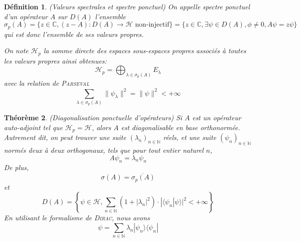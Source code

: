 \documentclass[svgnames,dvipsnames,a4paper,10pt,french]{report}
\newtheorem{theorem}{Théorème}[section]
\newtheorem{definition}[theorem]{Définition}
\begin{document}
\begin{appendices}
\begin{definition}{(Valeurs spectrales et spectre ponctuel)}
On appelle spectre ponctuel d'un opérateur $A$ sur $D(A)$ l'ensemble 
\begin{equation}
    \sigma_p(A) = \{ z\in\mathbb{C}, (z-A):D(A) \rightarrow \mathcal{H} \, \, \text{non-injectif} \} = \{z\in\mathbb{C}, \exists \psi\in D(A), \phi \neq 0,  A\psi = z\psi \}
\end{equation}
qui est donc l'ensemble de ses valeurs propres.

On note $\mathcal{H}_p$ la somme directe des espaces sous-espaces propres associés à toutes les valeurs propres ainsi obtenues:
\begin{equation}
    \mathcal{H}_p = \bigoplus_{\lambda\in\sigma_p(A)}E_\lambda
\end{equation}
avec la relation de \textsc{Parseval}
\begin{equation}
    \sum_{\lambda\in\sigma_p(A)} \|\psi_\lambda\|^2 = \|\psi\|^2 <+\infty
\end{equation}
\end{definition}

\begin{theorem}{(Diagonalisation ponctuelle d'opérateurs)}
Si $A$ est un opérateur auto-adjoint tel que $\mathcal{H}_p=\mathcal{H}$, alors $A$ est diagonalisable en base orthonormée. Autrement dit, on peut trouver une suite $(\lambda_n)_{n\in\mathbb{N}}$ réels, et une suite $(\psi_n)_{n\in\mathbb{N}}$ normés deux à deux orthogonaux, tels que pour tout entier naturel $n$, 
\begin{equation}
    A\psi_n = \lambda_n \psi_n
\end{equation} De plus, 
\begin{equation}
    \sigma(A) = \overline{\sigma_p(A)}
\end{equation}
et
\begin{equation}
    D(A) = \left\{ \psi \in \mathcal{H}, \sum_{n\in\mathbb{N}} (1+|\lambda_n|^2) \cdot |\langle \psi_n | \psi \rangle |^2 < + \infty \right\}
\end{equation}
En utilisant le formalisme de \textsc{Dirac}, nous avons
\begin{equation}
    \psi = \sum_{n\in\mathbb{N}} \lambda_n |\psi_n\rangle \langle \psi_n |
\end{equation}
\end{theorem}



\end{appendices}
\end{document}
